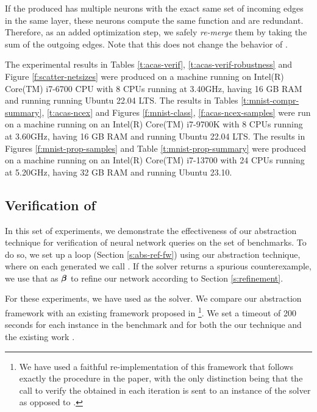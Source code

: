 If the \abs produced has multiple neurons with the exact same set of incoming
edges in the same layer, these neurons compute the same function and are
redundant. Therefore, as an added optimization step, we safely \textit{re-merge}
them by taking the sum of the outgoing edges. Note that this does not change the
behavior of \abs.

The experimental results in Tables \ref{t:acas-verif}, \ref{t:acas-verif-robustness} and Figure
\ref{f:scatter-netsizes} were produced on a machine running on Intel(R) Core(TM) 
i7-6700 CPU with 8 CPUs running at 3.40GHz, having 16 GB RAM and running running 
Ubuntu 22.04 LTS. The results in Tables \ref{t:mnist-compr-summary}, \ref{t:acas-ncex}
and Figures \ref{f:mnist-class}, \ref{f:acas-ncex-samples} were run on a 
machine running on an Intel(R) Core(TM) i7-9700K with 8 CPUs running at
3.60GHz, having 16 GB RAM and running Ubuntu 22.04 LTS. 
The results in Figures \ref{f:mnist-prop-samples} and Table \ref{t:mnist-prop-summary} were produced on a 
machine running on an Intel(R) Core(TM) i7-13700 with 24 CPUs running at
5.20GHz, having 32 GB RAM and running Ubuntu 23.10.

\subsection{Verification of \acasxu}
\label{s:acas-verif}

In this set of experiments, we demonstrate the effectiveness of our abstraction
technique for verification of neural network queries on the \acasxu set of
benchmarks. To do so, we set up a \cegar loop (Section \ref{s:abs-ref-fw}) using
our abstraction technique, where on each \abs generated we call \neuralsat. 
If the solver returns a spurious counterexample, we use
that as $\boldsymbol{\beta}$ to refine our network according to Section
\ref{s:refinement}.  

For these experiments, we have used \neuralsat as the solver. 
We compare our abstraction framework with an existing \cegar framework proposed
in \cite{cegar-nn} \footnote{We have used a faithful re-implementation of this framework that
follows exactly the procedure in the paper, with the only distinction being that
the call to verify the \abs obtained in each iteration is sent to an instance of
the \neuralsat solver as opposed to \marabou. }. We set a
timeout of 200 seconds for each instance in the benchmark and for both the
our technique and the existing work \cite{cegar-nn}.

